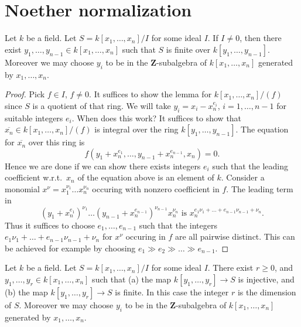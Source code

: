 \section{Noether normalization}
\label{section-Noether-normalization}

\begin{lemma}
\label{lemma-one-relation}
Let $k$ be a field.
Let $S = k[x_1,\ldots,x_n]/I$ for some ideal $I$.
If $I \not= 0$, then there exist $y_1,\ldots,y_{n-1} \in k[x_1,\ldots,x_n]$
such that $S$ is finite over $k[y_1,\ldots,y_{n-1}]$. Moreover we may
choose $y_i$ to be in the $\mathbf{Z}$-subalgebra of $k[x_1,\ldots,x_n]$
generated by $x_1,\ldots,x_n$.
\end{lemma}

\begin{proof}
Pick $f \in I$, $f\not = 0$. It suffices to show the lemma
for $k[x_1,\ldots,x_n]/(f)$ since $S$ is a quotient of that ring.
We will take $y_i = x_i - x_n^{e_i}$, $i = 1,\ldots,n-1$
for suitable integers $e_i$. When does this work? It suffices
to show that $\overline{x_n} \in k[x_1,\ldots,x_n]/(f)$
is integral over the ring $k[y_1,\ldots,y_{n-1}]$. The
equation for $\overline{x_n}$ over this ring is
$$
f(y_1 + x_n^{e_1}, \ldots, y_{n-1} + x_n^{e_{n-1}}, x_n) = 0.
$$
Hence we are done if we can show there exists integers $e_i$ such
that the leading coefficient w.r.t.\ $x_n$ of the equation
above is an element of $k$. Consider a monomial
$x^\nu = x_1^{\nu_1} \ldots x_n^{\nu_n}$ occuring with
nonzero coefficient in $f$. The leading term in
$$
(y_1 + x_n^{e_1})^{\nu_1} \ldots (y_{n-1} + x_n^{e_{n-1}})^{\nu_{n-1}}
x_n^{\nu_n}
\text{\ \ is\ \ }x_n^{e_1\nu_1 + \ldots + e_{n-1}\nu_{n-1} + \nu_n}.
$$
Thus it suffices to choose $e_1,\ldots,e_{n-1}$ such that
the integers $e_1\nu_1 + \ldots + e_{n-1}\nu_{n-1} + \nu_n$
for $x^\nu$ occuring in $f$ are all pairwise distinct.
This can be achieved for example by choosing $e_1 \gg
e_2 \gg \ldots \gg e_{n-1}$.
\end{proof}

\begin{lemma}
\label{lemma-Noether-normalization}
Let $k$ be a field. Let $S = k[x_1,\ldots,x_n]/I$ for some ideal $I$.
There exist $r\geq 0$, and $y_1,\ldots,y_r \in k[x_1,\ldots,x_n]$
such that (a) the map $k[y_1,\ldots,y_r] \to S$ is injective,
and (b) the map $k[y_1,\ldots,y_r] \to S$ is finite.
In this case the integer $r$ is the dimension of $S$.
Moreover we may choose $y_i$ to be in the
$\mathbf{Z}$-subalgebra of $k[x_1,\ldots,x_n]$
generated by $x_1,\ldots,x_n$.
\end{lemma}

